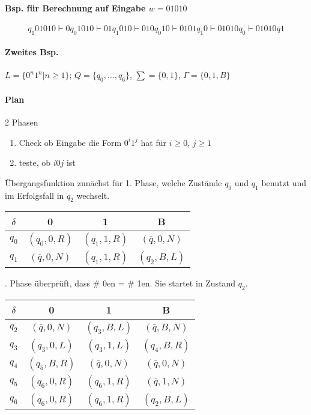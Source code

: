 \paragraph*{Bsp. für Berechnung auf Eingabe $w=01010$} $$q_1 01010 \vdash 0q_0 1010 \vdash 01q_1 010 \vdash 010q_0 10 \vdash 0101q_1 0 \vdash 01010q_0 \vdash 01010\overline{q}1$$

\paragraph*{Zweites Bsp.} $L=\{ 0^n1^n | n \geq 1 \}$; $Q=\{ q_0,\dots,q_6 \}$, $\sum=\{0,1\}$, $\Gamma=\{0,1,B\}$

\paragraph*{Plan} 2 Phasen
\begin{enumerate}
	\item Check ob Eingabe die Form $0^i1^j$ hat für $i \geq 0$, $j \geq 1$
	\item teste, ob $i0j$ ist
\end{enumerate}
Übergangsfunktion zunächst für 1. Phase, welche Zustände $q_0$ und $q_1$ benutzt und im Erfolgsfall in $q_2$ wechselt.

\begin{table}[htb!]
\centering
\begin{tabular}{c|c c c}
$\delta$ & 0 & 1 & B \\
\hline 
$q_0$ & $(q_0,0,R)$ & $(q_1,1,R)$ & $(\overline{q},0,N)$ \\
$q_1$ & $(\overline{q},0,N)$ & $(q_1,1,R)$ & $(q_2,B,L)$ \\
\end{tabular}
\end{table}

\par{}. Phase überprüft, dass \# 0en = \# 1en. Sie startet in Zustand $q_2$.\par\medskip

\begin{table}[htb!]
\centering
\begin{tabular}{c|c c c}
$\delta$ & 0 & 1 & B \\
\hline
$q_2$ & $(\overline{q},0,N)$ & $(q_3,B,L)$ & $(\overline{q},B,N)$ \\
$q_3$ & $(q_3,0,L)$ & $(q_3,1,L)$ & $(q_4,B,R)$ \\
$q_4$ & $(q_5,B,R)$ & $(\overline{q},0,N)$ & $(\overline{q},0,N)$ \\
$q_5$ & $(q_6,0,R)$ & $(q_6,1,R)$ & $(\overline{q},1,N)$ \\
$q_6$ & $(q_6,0,R)$ & $(q_6,1,R)$ & $(q_2,B,L)$ \\
\end{tabular}
\end{table}

